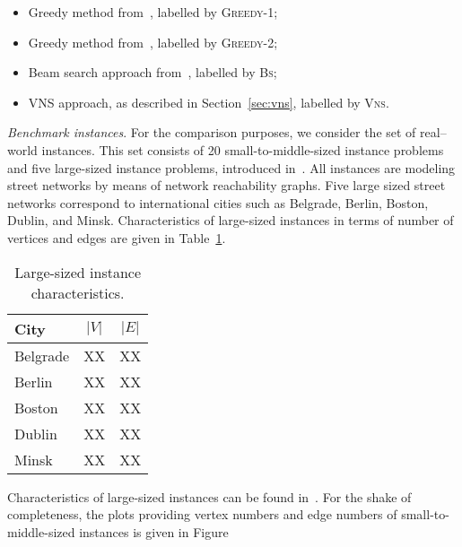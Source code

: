 \documentclass[dvipsnames,format=sigconf,anonymous=true,review=true]{acmart}
\begin{document}
\begin{itemize}
	\item Greedy method from~\cite{parekh1991analysis,gagarin2013randomized}, labelled by \textsc{Greedy-1};
	\item Greedy method from~\cite{gagarin2018multiple}, labelled by \textsc{Greedy-2};
	\item Beam search approach from~\cite{corcoran2021heuristics}, labelled by \textsc{Bs};
	\item VNS approach, as described in Section~\ref{sec:vns}, labelled by \textsc{Vns}.  
\end{itemize}


\emph{Benchmark instances}. For the comparison purposes, we consider the set of real--world instances. This set consists of 20 small-to-middle-sized instance problems and five large-sized instance problems, introduced in~\cite{corcoran2021heuristics}. All instances are  modeling street networks by means of network reachability graphs. Five large sized street networks correspond to international cities such as Belgrade, Berlin, Boston, Dublin, and Minsk.
 Characteristics of large-sized instances in terms of number of vertices and edges are given in Table~\ref{tab:big_instances_chars}. 
 
 \begin{table}
 	\begin{tabular}{lcc}
 		\textbf{City}      & $|V|$ & $|E|$ \\ \hline
 		Belgrade  & XX    &   XX  \\ 
 		Berlin        & XX    &   XX \\
 	    Boston        & XX    &   XX \\
 	    Dublin        & XX    &   XX \\
 	    Minsk        & XX    &   XX \\ \hline
 	\end{tabular}
     \caption{Large-sized instance characteristics.}
          \label{tab:big_instances_chars}  
 \end{table}
 
 Characteristics of large-sized instances can be found in~\cite{corcoran2021heuristics}. For the shake of completeness, the plots providing vertex numbers and edge numbers of small-to-middle-sized instances is given in Figure  
 
\end{document}
